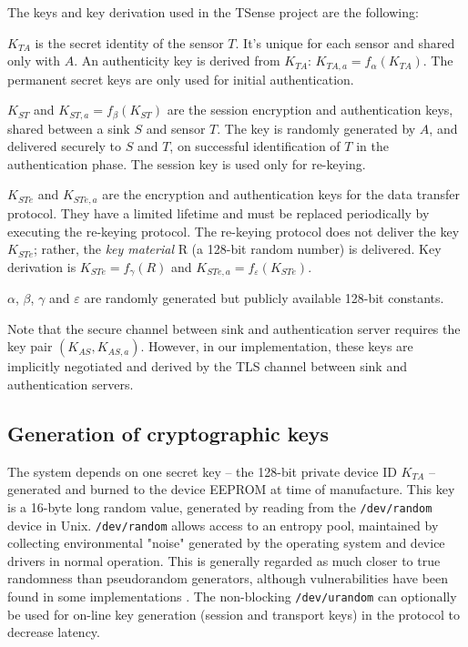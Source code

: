 The keys and key derivation used in the TSense project are the following:
%
\begin{description}

\item $K_{TA}$ is the secret identity of the sensor $T$. It's unique for each sensor and shared only with $A$. An authenticity key is derived from $K_{TA}$: $K_{TA,a} = f_\alpha(K_{TA})$. The permanent secret keys are only used for initial authentication.

\item $K_{ST}$ and $K_{ST,a}=f_\beta(K_{ST})$ are the session encryption and authentication keys, shared between a sink $S$ and sensor $T$. The key is randomly generated by $A$, and delivered securely to $S$ and $T$, on successful identification of $T$ in the authentication phase. The session key is used only for re-keying.

\item $K_{STe}$ and $K_{STe,a}$ are the encryption and authentication keys for the data transfer protocol. They have a limited lifetime and must be replaced periodically by executing the re-keying protocol. The re-keying protocol does not deliver the key $K_{STe}$; rather, the \textit{key material} R (a 128-bit random number) is delivered. Key derivation is $K_{STe} = f_\gamma(R)$ and $K_{STe,a} = f_\varepsilon(K_{STe})$. 
\end{description}
%
$\alpha$, $\beta$, $\gamma$ and $\varepsilon$ are randomly generated but publicly available 128-bit constants.

Note that the secure channel between sink and authentication server requires the key pair $(K_{AS},K_{AS,a})$. However, in our implementation, these keys are implicitly negotiated and derived by the TLS channel between sink and authentication servers.

\subsection{Generation of cryptographic keys}

The system depends on one secret key -- the 128-bit private device ID $K_{TA}$ -- generated and burned to the device EEPROM at time of manufacture. This key is a 16-byte long random value, generated by reading from the \texttt{/dev/random} device in Unix. \texttt{/dev/random} allows access to an entropy pool, maintained by collecting environmental "noise" generated by the operating system and device drivers in normal operation. This is generally regarded as much closer to true randomness than pseudorandom generators, although vulnerabilities have been found in some implementations . The non-blocking \texttt{/dev/urandom} can optionally be used for on-line key generation (session and transport keys) in the protocol to decrease latency.

